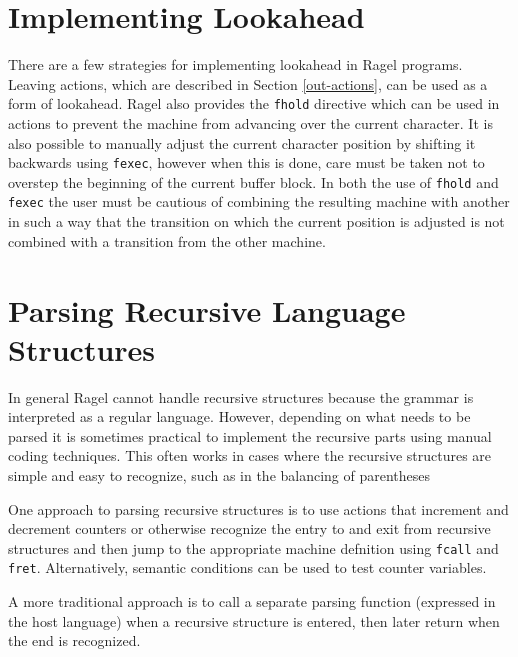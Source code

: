 \documentclass[letterpaper,11pt,oneside]{book}
\begin{document}
\section{Implementing Lookahead}

There are a few strategies for implementing lookahead in Ragel programs.
Leaving actions, which are described in Section \ref{out-actions}, can be
used as a form of lookahead.  Ragel also provides the \verb|fhold| directive
which can be used in actions to prevent the machine from advancing over the
current character. It is also possible to manually adjust the current character
position by shifting it backwards using \verb|fexec|, however when this is
done, care must be taken not to overstep the beginning of the current buffer
block. In both the use of \verb|fhold| and \verb|fexec| the user must be
cautious of combining the resulting machine with another in such a way that the
transition on which the current position is adjusted is not combined with a
transition from the other machine.

\section{Parsing Recursive Language Structures}

In general Ragel cannot handle recursive structures because the grammar is
interpreted as a regular language. However, depending on what needs to be
parsed it is sometimes practical to implement the recursive parts using manual
coding techniques. This often works in cases where the recursive structures are
simple and easy to recognize, such as in the balancing of parentheses

One approach to parsing recursive structures is to use actions that increment
and decrement counters or otherwise recognize the entry to and exit from
recursive structures and then jump to the appropriate machine defnition using
\verb|fcall| and \verb|fret|. Alternatively, semantic conditions can be used to
test counter variables.

A more traditional approach is to call a separate parsing function (expressed
in the host language) when a recursive structure is entered, then later return
when the end is recognized.
\end{document}
